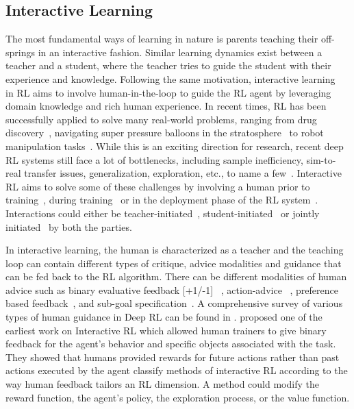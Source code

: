 \documentclass[twoside,11pt]{article}
\begin{document}
\subsection{Interactive Learning}
\label{IRLBackground}
    
The most fundamental ways of learning in nature is parents teaching their off-springs in an interactive fashion. Similar learning dynamics exist between a teacher and a student, where the teacher tries to guide the student with their experience and knowledge. Following the same motivation, interactive learning~\citep{Arzate:2020:SurveyInteractiveRL} in RL aims to involve human-in-the-loop to guide the RL agent by leveraging domain knowledge and rich human experience. In recent times,  RL has been successfully applied to solve many real-world problems, ranging from drug discovery~\citep{popova2018deep}, navigating super pressure balloons in the stratosphere~\citep{bellemare2020autonomous} to robot manipulation tasks~\citep{nguyen2019review}. While this is an exciting direction for research, recent deep RL systems still face a lot of bottlenecks, including sample inefficiency, sim-to-real transfer issues, generalization, exploration, etc., to name a few~\citep{ibarz2021train}. Interactive RL aims to solve some of these challenges by involving a human prior to training~\citep{Guo:2022:RLSurveyHumanPriorKnowledge}, during training~\citep{Knox:2008:TAMER} or in the deployment phase of the RL system~\citep{guo2021edge}. Interactions could either be teacher-initiated~\citep{torrey2013teaching}, student-initiated~\citep{da2020uncertainty,MandelEtAl:2017ActionsInHITL} or jointly initiated~\citep{amir2016interactive} by both the parties.

In interactive learning, the human is characterized as a teacher and the teaching loop can contain different types of critique, advice modalities and guidance that can be fed back to the RL algorithm. There can be different modalities of human advice such as binary evaluative feedback [+1/-1] ~\citep{Knox:2008:TAMER}, action-advice~\citep{torrey2013teaching} , preference based feedback~\citep{Christiano:2017:DeepRLHumanPreferences,LeeSmithAbbeel:2021:FeedbackPreferenceHITLLearningPEBBLE}, and sub-goal specification~\citep{le2018hierarchical}. A comprehensive survey of various types of human guidance in Deep RL can be found in \citep{zhang2019leveraging}. \citet{Thomaz:2006:RLWithHumanTeachers} proposed one of the earliest work on Interactive RL which allowed human trainers to give binary feedback for the agent's behavior and specific objects associated with the task. They showed that humans provided rewards for future actions rather than past actions executed by the agent \citep{Arzate:2020:SurveyInteractiveRL} classify methods of interactive RL according to the way human feedback tailors an RL dimension. A method could modify the reward function, the agent's policy, the exploration process, or the value function.  
\end{document}
